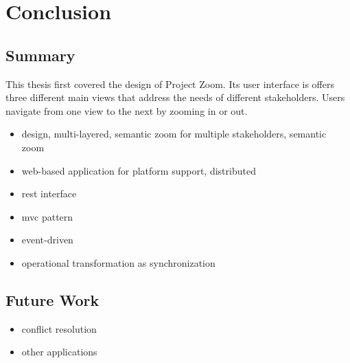 \chapter{Conclusion}


\section{Summary}
This thesis first covered the design of Project Zoom. Its user interface is offers three different main views that address the needs of different stakeholders. Users navigate from one view to the next by zooming in or out.

\begin{itemize}
\item design, multi-layered, semantic zoom for multiple stakeholders, semantic zoom
\item web-based application for platform support, distributed
\item rest interface
\item mvc pattern
\item event-driven
\item operational transformation as synchronization
\end{itemize}

\section{Future Work}

\begin{itemize}
\item conflict resolution
\item other applications
\end{itemize}